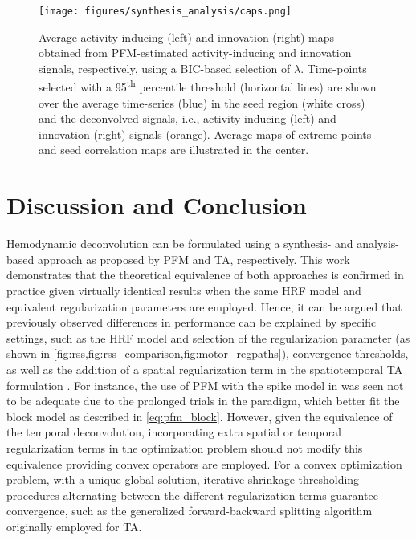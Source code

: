 \begin{figure}[t!]
    \begin{center}
        \texttt{[image: figures/synthesis\_analysis/caps.png]}
    \end{center}
    \caption{Average activity-inducing (left) and innovation (right) maps
    obtained from PFM-estimated activity-inducing and innovation signals,
    respectively, using a BIC-based selection of $\lambda$. Time-points selected
    with a 95\textsuperscript{th} percentile threshold (horizontal lines) are
    shown over the average time-series (blue) in the seed region (white cross)
    and the deconvolved signals, i.e., activity inducing (left) and innovation
    (right) signals (orange). Average maps of extreme points and seed
    correlation maps are illustrated in the center.}
\label{fig:caps}
\end{figure}

\section{Discussion and Conclusion}
\label{sec:synthesis_discussion}

Hemodynamic deconvolution can be formulated using a synthesis- and
analysis-based approach as proposed by PFM and TA, respectively. This work
demonstrates that the theoretical equivalence of both approaches is confirmed in
practice given virtually identical results when the same HRF model and
equivalent regularization parameters are employed. Hence, it can be argued that
previously observed differences in performance can be explained by specific
settings, such as the HRF model and selection of the regularization parameter
(as shown in \cref{fig:rss,fig:rss_comparison,fig:motor_regpaths}), convergence
thresholds, as well as the addition of a spatial regularization term in the
spatiotemporal TA formulation \citep{Karahanoglu2013TotalactivationfMRI}. For
instance, the use of PFM with the spike model in
\cite{Tan2017DecodingfMRIevents} was seen not to be adequate due to the
prolonged trials in the paradigm, which better fit the block model as described
in \cref{eq:pfm_block}. However, given the equivalence of the temporal
deconvolution, incorporating extra spatial or temporal regularization terms in
the optimization problem should not modify this equivalence providing convex
operators are employed. For a convex optimization problem, with a unique global
solution, iterative shrinkage thresholding procedures alternating between the
different regularization terms guarantee convergence, such as the generalized
forward-backward splitting \citep{Raguet2013GeneralizedForwardBackward}
algorithm originally employed for TA. 

